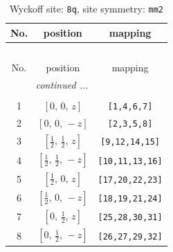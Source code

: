 \documentclass[fleqn,8pt]{jsarticle}
\begin{document}
\begin{longtable}{ccc}
\caption{Wyckoff site: {\tt 8q}, site symmetry: {\tt mm2}}
 \\
 \hline \hline
No. & position & mapping \\ \hline \endfirsthead

\multicolumn{2}{l}{\tablename\ \thetable{}} \\
 \hline \hline
No. & position & mapping \\ \hline \endhead

 \hline \hline
\multicolumn{2}{r}{\footnotesize\it continued ...} \\ \endfoot

 \hline \hline
\multicolumn{2}{r}{} \\ \endlastfoot

1 & $\left[ 0,\, 0,\, z \right]$ & {\tt [1,4,6,7]} \\ \hline
2 & $\left[ 0,\, 0,\, - z \right]$ & {\tt [2,3,5,8]} \\ \hline
3 & $\left[ \frac{1}{2},\, \frac{1}{2},\, z \right]$ & {\tt [9,12,14,15]} \\ \hline
4 & $\left[ \frac{1}{2},\, \frac{1}{2},\, - z \right]$ & {\tt [10,11,13,16]} \\ \hline
5 & $\left[ \frac{1}{2},\, 0,\, z \right]$ & {\tt [17,20,22,23]} \\ \hline
6 & $\left[ \frac{1}{2},\, 0,\, - z \right]$ & {\tt [18,19,21,24]} \\ \hline
7 & $\left[ 0,\, \frac{1}{2},\, z \right]$ & {\tt [25,28,30,31]} \\ \hline
8 & $\left[ 0,\, \frac{1}{2},\, - z \right]$ & {\tt [26,27,29,32]} \\
\end{longtable}
\renewcommand{\arraystretch}{1.2}
\end{document}
